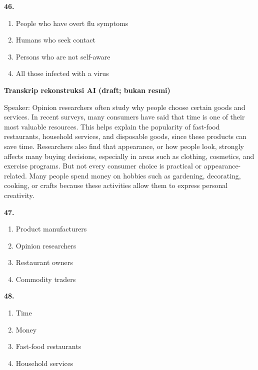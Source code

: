 \documentclass[12pt]{article}
\begin{document}
\par
\vspace{0.25\baselineskip}
\noindent\textbf{46.}
\begin{enumerate}[label=(\Alph*),leftmargin=*,itemsep=0.2em]
\item People who have overt flu symptoms
\item Humans who seek contact
\item Persons who are not self-aware
\item All those infected with a virus
\end{enumerate}
\par
\vspace{0.25\baselineskip}
\begin{exampleblock}
\textbf{Transkrip rekonstruksi AI (draft; bukan resmi)}\par
Speaker: Opinion researchers often study why people choose certain goods and services. In recent surveys, many consumers have said that time is one of their most valuable resources. This helps explain the popularity of fast-food restaurants, household services, and disposable goods, since these products can save time. Researchers also find that appearance, or how people look, strongly affects many buying decisions, especially in areas such as clothing, cosmetics, and exercise programs. But not every consumer choice is practical or appearance-related. Many people spend money on hobbies such as gardening, decorating, cooking, or crafts because these activities allow them to express personal creativity.\par
\end{exampleblock}
\noindent\textbf{47.}
\begin{enumerate}[label=(\Alph*),leftmargin=*,itemsep=0.2em]
\item Product manufacturers
\item Opinion researchers
\item Restaurant owners
\item Commodity traders
\end{enumerate}
\par
\vspace{0.25\baselineskip}
\noindent\textbf{48.}
\begin{enumerate}[label=(\Alph*),leftmargin=*,itemsep=0.2em]
\item Time
\item Money
\item Fast-food restaurants
\item Household services
\end{enumerate}
\end{document}
